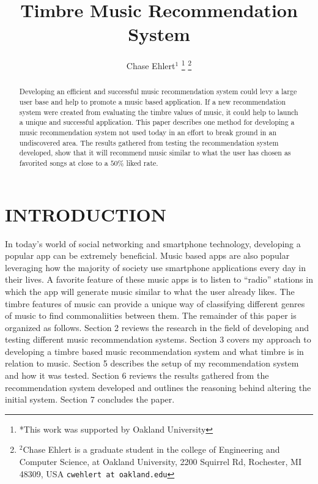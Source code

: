 \documentclass[letterpaper, 10 pt, conference]{ieeeconf}
\title{\LARGE \bf
Timbre Music Recommendation System
}
\author{Chase Ehlert$^{1}$%
\thanks{*This work was supported by Oakland University}%
\thanks{$^{2}$Chase Ehlert is a graduate student in the college of Engineering and Computer Science, at Oakland University, 2200 Squirrel Rd, Rochester, MI 48309, USA
        {\tt\small cwehlert at oakland.edu}}%
}
\begin{document}
\maketitle
\thispagestyle{empty}
\pagestyle{empty}


\begin{abstract}
Developing an efficient and successful music recommendation system could levy a large user base and help to promote a music based application. If a new recommendation system were created from evaluating the timbre values of music, it could help to launch a unique and successful application. This paper describes one method for developing a music recommendation system not used today in an effort to break ground in an undiscovered area. The results gathered from testing the recommendation system developed, show that it will recommend music similar to what the user has chosen as favorited songs at close to a $50\%$ liked rate.

\end{abstract}


\section{INTRODUCTION}
In today’s world of social networking and smartphone technology, developing a popular app can be extremely beneficial. Music based apps are also popular leveraging how the majority of society use smartphone applications every day in their lives. A favorite feature of these music apps is to listen to “radio” stations in which the app will generate music similar to what the user already likes. The timbre features of music can provide a unique way of classifying different genres of music to find commonaliities between them. The remainder of this paper is organized as follows. Section 2 reviews the research in the field of developing and testing different music recommendation systems. Section 3 covers my approach to developing a timbre based music recommendation system and what timbre is in relation to music. Section 5 describes the setup of my recommendation system and how it was tested. Section 6 reviews the results gathered from the recommendation system developed and outlines the reasoning behind altering the initial system. Section 7 concludes the paper.
\end{document}

